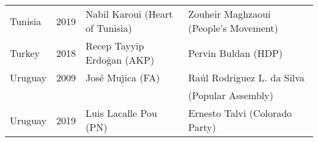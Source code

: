 {\begin{longtable}{|l|c|l|l|}
 Tunisia     & 2019 & Nabil Karoui (Heart of Tunisia) & Zouheir Maghzaoui (People's Movement)  \\ 
 Turkey     & 2018 &   Recep Tayyip Erdo\u{g}an (AKP) &   Pervin Buldan (HDP)    \\ 
 Uruguay     & 2009 &   Jos\'e Mujica (FA)  &  Ra\'ul Rodriguez L. da Silva   \\ 
        &   &    &   (Popular Assembly) \\ 
 Uruguay     & 2019 &   Luis Lacalle Pou (PN)        &   Ernesto Talvi (Colorado Party)    \\ 
  \bottomrule 
\end{longtable} }